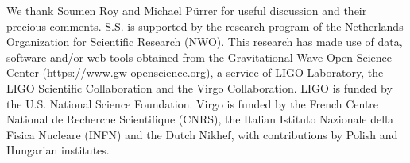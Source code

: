 \documentclass[twocolumn,showpacs,preprintnumbers,nofootinbib,prd,
superscriptaddress,10pt]{revtex4-2}
\begin{document}


        \begin{acknowledgments}
          We thank Soumen Roy and Michael P{\"u}rrer for useful discussion and their precious comments.
          S.S. is supported by the research program of the Netherlands Organization for Scientific Research (NWO).
          This research has made use of data, software and/or web tools obtained 
          from the Gravitational Wave Open Science Center (https://www.gw-openscience.org), 
          a service of LIGO Laboratory, the LIGO Scientific Collaboration and the 
          Virgo Collaboration. LIGO is funded by the U.S. National Science Foundation. 
          Virgo is funded by the French Centre National de Recherche Scientifique (CNRS), 
          the Italian Istituto Nazionale della Fisica Nucleare (INFN) and the 
          Dutch Nikhef, with contributions by Polish and Hungarian institutes.
        \end{acknowledgments}

	

	
	
\end{document}
